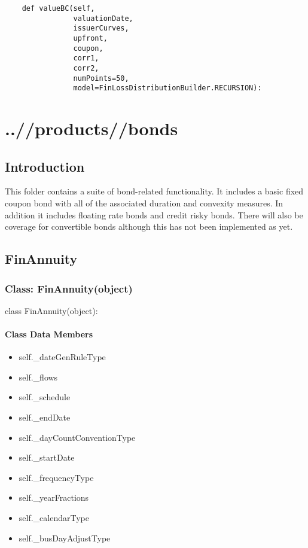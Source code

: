 \documentclass[twoside,11pt]{book}
\begin{document}
\begin{lstlisting}
    def valueBC(self,
                valuationDate,
                issuerCurves,
                upfront,
                coupon,
                corr1,
                corr2,
                numPoints=50,
                model=FinLossDistributionBuilder.RECURSION):
\end{lstlisting}


\chapter{..//products//bonds}
\section{Introduction}
This folder contains a suite of bond-related functionality. It includes a basic fixed coupon bond with all of the associated duration and convexity measures. In addition it includes floating rate bonds and credit risky bonds. There will also be coverage for convertible bonds although this has not been implemented as yet.

\newpage
\section{FinAnnuity}

\subsection{Class: FinAnnuity(object)}
class FinAnnuity(object):

\subsubsection{Class Data Members}
\begin{itemize}
\item{self.\_dateGenRuleType}
\item{self.\_flows}
\item{self.\_schedule}
\item{self.\_endDate}
\item{self.\_dayCountConventionType}
\item{self.\_startDate}
\item{self.\_frequencyType}
\item{self.\_yearFractions}
\item{self.\_calendarType}
\item{self.\_busDayAdjustType}
\end{itemize}
\end{document}
